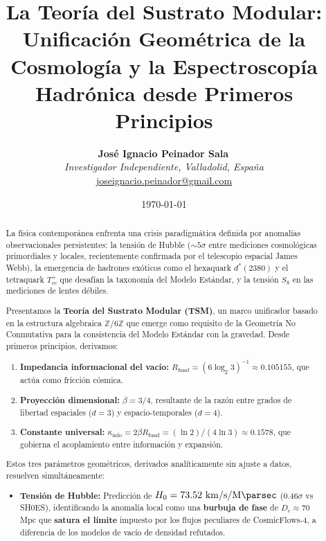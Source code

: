 \documentclass[11pt, a4paper]{article}
\title{\textbf{La Teoría del Sustrato Modular: \\ Unificación Geométrica de la Cosmología y la Espectroscopía Hadrónica desde Primeros Principios}}
\author{
  \textbf{José Ignacio Peinador Sala}\,\orcidlink{0009-0008-1822-3452} \\
  \textit{Investigador Independiente, Valladolid, España} \\
  \small\href{mailto:joseignacio.peinador@gmail.com}{joseignacio.peinador@gmail.com}
}
\date{\today}
\theoremstyle{plain}
\theoremstyle{definition}
\newcommand{\Rfactor}{R_{\text{fund}}}
\newcommand{\Kinfo}{\kappa_{\text{info}}}
\begin{document}
\maketitle


\begin{abstract}
\noindent
La física contemporánea enfrenta una crisis paradigmática definida por anomalías observacionales persistentes: la tensión de Hubble ($\sim 5\sigma$ entre mediciones cosmológicas primordiales y locales, recientemente confirmada por el telescopio espacial James Webb), la emergencia de hadrones exóticos como el hexaquark $d^*(2380)$ y el tetraquark $T_{cc}^+$ que desafían la taxonomía del Modelo Estándar, y la tensión $S_8$ en las mediciones de lentes débiles. 

Presentamos la \textbf{Teoría del Sustrato Modular (TSM)}, un marco unificador basado en la estructura algebraica $\mathbb{Z}/6\mathbb{Z}$ que emerge como requisito de la Geometría No Conmutativa para la consistencia del Modelo Estándar con la gravedad. Desde primeros principios, derivamos:

\begin{enumerate}
    \item \textbf{Impedancia informacional del vacío:} $\Rfactor = (6\log_2 3)^{-1} \approx 0.105155$, que actúa como fricción cósmica.
    
    \item \textbf{Proyección dimensional:} $\beta = 3/4$, resultante de la razón entre grados de libertad espaciales ($d=3$) y espacio-temporales ($d=4$).
    
    \item \textbf{Constante universal:} $\Kinfo = 2\beta\Rfactor = (\ln 2)/(4\ln 3) \approx 0.1578$, que gobierna el acoplamiento entre información y expansión.
\end{enumerate}

Estos tres parámetros geométricos, derivados analíticamente sin ajuste a datos, resuelven simultáneamente:

\begin{itemize}
    \item \textbf{Tensión de Hubble:} Predicción de $H_0 = 73.52\ \si{\kilo\meter\per\second\per\mega\parsec}$ ($0.46\sigma$ vs SH0ES), identificando la anomalía local como una \textbf{burbuja de fase} de $D_c \approx 70$ Mpc que \textbf{satura el límite} impuesto por los flujos peculiares de CosmicFlows-4, a diferencia de los modelos de vacío de densidad refutados.
    

\end{itemize}
\end{abstract}
\end{document}
